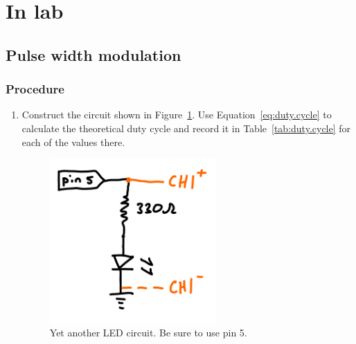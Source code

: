 \documentclass[11pt]{article} %
\begin{document}
\section{In lab}

\subsection{Pulse width modulation}
\label{sec.analout}

\subsubsection*{Procedure}
\begin{enumerate}
\item Construct the circuit shown in Figure~\ref{fig:led.pwm}. Use Equation~\ref{eq:duty.cycle} to calculate the theoretical duty cycle and record it in Table~\ref{tab:duty.cycle} for each of the values there.

\begin{figure}[htbp]
\begin{center}
\includegraphics[width=2.5in]{figures/led5}
\caption{Yet another LED circuit. Be sure to use pin 5.}
\label{fig:led.pwm}
\end{center}
\end{figure}


\end{enumerate}
\end{document}
